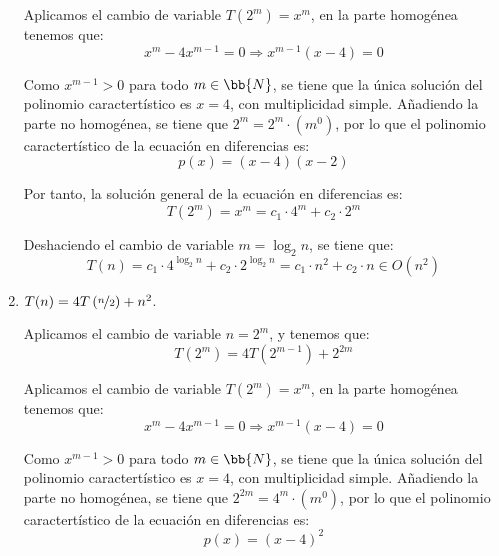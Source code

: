 \begin{ejercicio}
\begin{enumerate}[label=\alph*)]
        Aplicamos el cambio de variable $T(2^m)=x^m$, en la parte homogénea tenemos que:
        \begin{equation*}
            x^m - 4x^{m-1} = 0 \Longrightarrow x^{m-1}(x-4)=0
        \end{equation*}

        Como $x^{m-1}>0$ para todo $m\in \bb{N}$, se tiene que la única solución del polinomio caractertístico es $x=4$,
        con multiplicidad simple. Añadiendo la parte no homogénea, se tiene que $2^m = 2^m \cdot (m^0)$, por lo que el polinomio caractertístico
        de la ecuación en diferencias es:
        \begin{equation*}
            p(x) = (x-4)(x-2)
        \end{equation*}

        Por tanto, la solución general de la ecuación en diferencias es:
        \begin{equation*}
            T(2^m) = x^m = c_1\cdot 4^m + c_2\cdot 2^m
        \end{equation*}

        Deshaciendo el cambio de variable $m=\log_2 n$, se tiene que:
        \begin{equation*}
            T(n) = c_1\cdot 4^{\log_2 n} + c_2\cdot 2^{\log_2 n} = c_1\cdot n^2 + c_2\cdot n \in O(n^2)
        \end{equation*}

        \item $T(n)=4T\left(\nicefrac{n}{2}\right) + n^2$.
        
        Aplicamos el cambio de variable $n=2^m$, y tenemos que:
        \begin{equation*}
            T(2^m)=4T\left(2^{m-1}\right) + 2^{2m}
        \end{equation*}

        Aplicamos el cambio de variable $T(2^m)=x^m$, en la parte homogénea tenemos que:
        \begin{equation*}
            x^m - 4x^{m-1} = 0 \Longrightarrow x^{m-1}(x-4)=0
        \end{equation*}

        Como $x^{m-1}>0$ para todo $m\in \bb{N}$, se tiene que la única solución del polinomio caractertístico es $x=4$,
        con multiplicidad simple. Añadiendo la parte no homogénea, se tiene que $2^{2m} = 4^{m} \cdot (m^0)$, por lo que el polinomio caractertístico
        de la ecuación en diferencias es:
        \begin{equation*}
            p(x) = (x-4)^2
        \end{equation*}


\end{enumerate}
\end{ejercicio}
